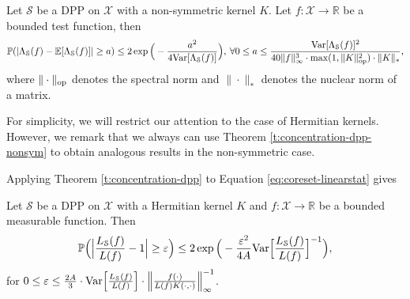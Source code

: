 \begin{theorem} \label{t:concentration-dpp-nonsym}
    Let $\mathcal S$ be a DPP on $\mathcal X$ with a non-symmetric kernel $K$. Let $f: \mathcal X \rightarrow \mathbb R$ be a bounded test function, then
    \[\mathbb P(|\Lambda_{\mathcal S}(f) - \mathbb E[\Lambda_{\mathcal S}(f)]| \ge a ) 
    \le 2 \exp \Big ( -{a^2 \over 4\mathrm{Var}[\Lambda_{\mathcal S}(f)]} \Big ), 
    \: \forall 0 \le a \le {\mathrm{Var}[\Lambda_{\mathcal S}(f)]^2 \over  40\|f\|_\infty^3 \cdot \max(1,\|K\|_{\mathrm{op}}^2) \cdot  \|K\|_* } ,\]
    where $\|\cdot\|_{\mathrm{op}}$ denotes the spectral norm and $\|\cdot \|_*$ denotes the nuclear norm of a matrix.
\end{theorem}

\begin{remark}
    For simplicity, we will restrict our attention to the case of Hermitian kernels. However, we remark that we always can use Theorem \ref{t:concentration-dpp-nonsym} to obtain analogous results in the non-symmetric case.
\end{remark}


Applying Theorem \ref{t:concentration-dpp} to Equation \eqref{eq:coreset-linearstat} gives 
\begin{corollary} \label{c:coreset-dpp}
      Let $\mathcal S$ be a DPP on $\mathcal X$ with a Hermitian kernel $K$ and $f:\mathcal X \rightarrow \mathbb R$ be a bounded measurable function. Then
      \[ \mathbb P \Big ( \Big |\frac{L_{\mathcal S}(f)}{L(f)} -1 \Big | \ge \varepsilon \Big ) \le 2 \exp \Big ( -\frac{\varepsilon^2}{4A} \mathrm{Var} \Big [ \frac{L_{\mathcal S}(f)}{L(f)}\Big ]^{-1} \Big ),\]
      for $0 \le \varepsilon\le \frac{2A}{3} \cdot \mathrm{Var} \Big [ \frac{L_{\mathcal S}(f)}{L(f)}\Big ] \cdot 
      \Big \| \frac{f(\cdot)}{L(f) K(\cdot,\cdot)} \Big \|_\infty^{-1}$.
\end{corollary}

